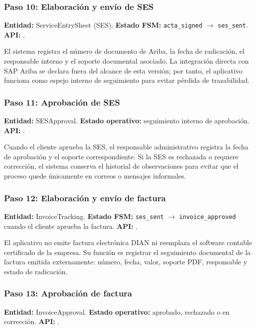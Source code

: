 \subsubsection{Paso 10: Elaboración y envío de SES}
\textbf{Entidad:} ServiceEntrySheet (SES). \textbf{Estado FSM:} \texttt{acta\_signed} $\rightarrow$ \texttt{ses\_sent}. \textbf{API:} .

El sistema registra el número de documento de Ariba, la fecha de radicación, el responsable interno y el soporte documental asociado. La integración directa con SAP Ariba se declara fuera del alcance de esta versión; por tanto, el aplicativo funciona como espejo interno de seguimiento para evitar pérdida de trazabilidad.

\subsubsection{Paso 11: Aprobación de SES}
\textbf{Entidad:} SESApproval. \textbf{Estado operativo:} seguimiento interno de aprobación. \textbf{API:} .

Cuando el cliente aprueba la SES, el responsable administrativo registra la fecha de aprobación y el soporte correspondiente. Si la SES es rechazada o requiere corrección, el sistema conserva el historial de observaciones para evitar que el proceso quede únicamente en correos o mensajes informales.

\subsubsection{Paso 12: Elaboración y envío de factura}
\textbf{Entidad:} InvoiceTracking. \textbf{Estado FSM:} \texttt{ses\_sent} $\rightarrow$ \texttt{invoice\_approved} cuando el cliente aprueba la factura. \textbf{API:} .

El aplicativo no emite factura electrónica DIAN ni reemplaza el software contable certificado de la empresa. Su función es registrar el seguimiento documental de la factura emitida externamente: número, fecha, valor, soporte PDF, responsable y estado de radicación.

\subsubsection{Paso 13: Aprobación de factura}
\textbf{Entidad:} InvoiceApproval. \textbf{Estado operativo:} aprobado, rechazado o en corrección. \textbf{API:} .

